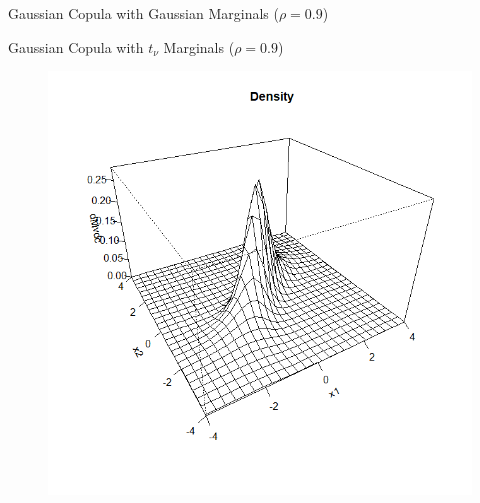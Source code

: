 \documentclass[11pt]{beamer}
\theoremstyle{plain}
\theoremstyle{definition}
\theoremstyle{remark}
\begin{document}
\begin{frame}{Gaussian Copula with Gaussian Marginals ($\rho = 0.9$)}
\begin{figure}[ht]
\begin{minipage}[b]{0.45\linewidth}
        \end{minipage}
    \end{figure}
\end{frame}
%
\begin{frame}{Gaussian Copula with $t_\nu$ Marginals ($\rho = 0.9$)}
    \begin{figure}[ht]
        \begin{minipage}[b]{0.45\linewidth}
            \centering
            \includegraphics[width=\textwidth]{fig/gauss_t_density_0_9.png}
        \end{minipage}
        \hspace{0.5cm}
        \begin{minipage}[b]{0.45\linewidth}
            \centering

\end{minipage}
\end{figure}
\end{frame}
\end{document}
